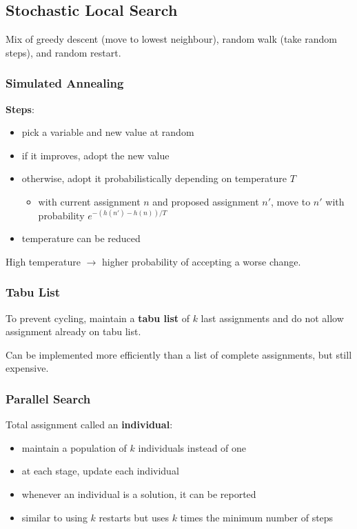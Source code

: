 \documentclass[11pt]{article}
\begin{document}
\subsection{Stochastic Local Search}
\label{sec:org09cfa67}
Mix of greedy descent (move to lowest neighbour), random walk (take random steps), and random restart.
\subsubsection{Simulated Annealing}
\label{sec:orgf627266}
\textbf{Steps}:
\begin{itemize}
\item pick a variable and new value at random
\item if it improves, adopt the new value
\item otherwise, adopt it probabilistically depending on temperature \(T\)
\begin{itemize}
\item with current assignment \(n\) and proposed assignment \(n'\), move to \(n'\) with probability
\(e^{-(h(n') - h(n))/T}\)
\end{itemize}
\item temperature can be reduced
\end{itemize}

High temperature \(\to\) higher probability of accepting a worse change.
\subsubsection{Tabu List}
\label{sec:org1e2368a}
To prevent cycling, maintain a \textbf{tabu list} of \(k\) last assignments and do not allow assignment
already on tabu list.

Can be implemented more efficiently than a list of complete assignments, but still expensive.
\subsubsection{Parallel Search}
\label{sec:org5f23fd7}
Total assignment called an \textbf{individual}:
\begin{itemize}
\item maintain a population of \(k\) individuals instead of one
\item at each stage, update each individual
\item whenever an individual is a solution, it can be reported
\item similar to using \(k\) restarts but uses \(k\) times the minimum number of steps
\end{itemize}
\end{document}
